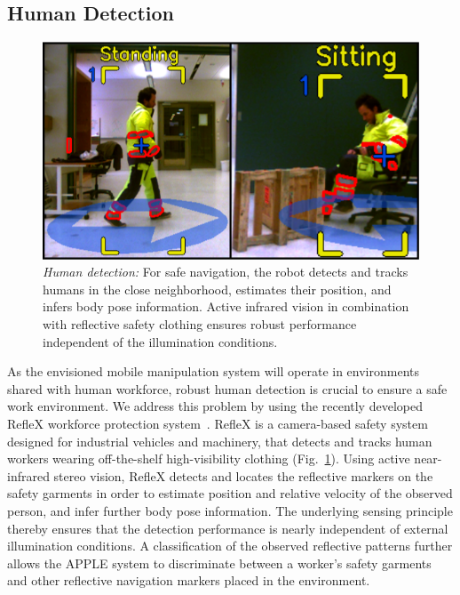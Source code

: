 \subsection{Human Detection}
\label{subsec:people_det}
%
\begin{figure}[t!]
  \begin{center}
    \includegraphics[width =0.99\linewidth]{figs/person_detection}
    \caption{\textit{Human detection:} For safe navigation, the robot detects and tracks humans in
      the close neighborhood, estimates their position, and infers body pose information. Active
      infrared vision in combination with reflective safety clothing ensures robust performance
      independent of the illumination conditions.}
    \label{fig:people_det}
    \vspace{-0.55cm}
  \end{center}
\end{figure}
% 
As the envisioned mobile manipulation system will operate in environments shared with human
workforce, robust human detection is crucial to ensure a safe work environment. We address this
problem by using the recently developed RefleX workforce protection system~\cite{Mosb14}. RefleX is
a camera-based safety system designed for industrial vehicles and machinery, that detects and tracks
human workers wearing off-the-shelf high-visibility clothing (Fig.~\ref{fig:people_det}). Using
active near-infrared stereo vision, RefleX detects and locates the reflective markers on the safety
garments in order to estimate position and relative velocity of the observed person, and infer
further body pose information. The underlying sensing principle thereby ensures that the detection
performance is nearly independent of external illumination conditions. A classification of the
observed reflective patterns further allows the APPLE system to discriminate between a worker's
safety garments and other reflective navigation markers placed in the environment.
